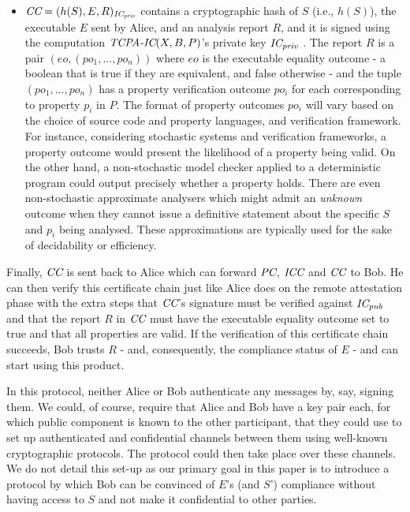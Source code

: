 \begin{itemize}[leftmargin=*]
	\item $\textit{CC}{} = (h(S), E, R)_{\textit{IC}{}_{\textit{priv}{}}}$ contains a cryptographic hash of $S$ (i.e., $h(S)$), the executable $E$ sent by Alice, and an analysis report $R$, and it is signed using the computation $\textit{TCPA-IC}{}(X,B,P)$'s private key $\textit{IC}{}_{\textit{priv}{}}$ . The report $R$ is a pair $(eo, (po_1,\ldots,po_{n}))$ where $eo$ is the executable equality outcome - a boolean that is true if they are equivalent, and false otherwise - and the tuple $(po_1,\ldots,po_{n})$ has a property verification outcome $po_i$ for each corresponding to property $p_i$ in $P$. The format of property outcomes $po_i$ will vary based on the choice of source code and property languages, and verification framework. For instance, considering stochastic systems and verification frameworks, a property outcome would present the likelihood of a property being valid. On the other hand, a non-stochastic model checker applied to a deterministic program could output precisely whether a property holds. There are even non-stochastic approximate analysers which might admit an \emph{unknown} outcome when they cannot issue a definitive statement about the specific $S$ and $p_i$ being analysed. These approximations are typically used for the sake of decidability or efficiency.
\end{itemize}

Finally, $\textit{CC}{}$ is sent back to Alice which can forward $\textit{PC}{}$, $\textit{ICC}{}$ and $\textit{CC}{}$ to Bob. He can then verify this certificate chain just like Alice does on the remote attestation phase with the extra steps that $\textit{CC}{}$'s signature must be verified against $\textit{IC}_{\textit{pub}{}}$ and that the report $R$ in $\textit{CC}{}$ must have the executable equality outcome set to true and that all properties are valid. If the verification of this certificate chain succeeds, Bob trusts $R$ - and, consequently, the compliance status of $E$ - and can start using this product.

In this protocol, neither Alice or Bob authenticate any messages by, say, signing them. We could, of course, require that Alice and Bob have a key pair each, for which public component is known to the other participant, that they could use to set up authenticated and confidential channels between them using well-known cryptographic protocols. The protocol could then take place over these channels. We do not detail this set-up as our primary goal in this paper is to introduce a protocol by which Bob can be convinced of $E$'s (and $S$') compliance without having access to $S$ and not make it confidential to other parties.

